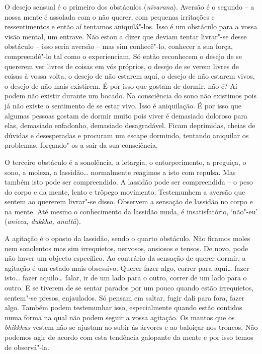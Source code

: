 O desejo sensual é o primeiro dos obstáculos (\emph{nīvarana}). Aversão
é o segundo -- a nossa mente é assolada com o não querer, com pequenas
irritações e ressentimentos e então aí tentamos aniquilá"-los. Isso é um
obstáculo para a vossa visão mental, um entrave. Não estou a dizer que
deviam tentar livrar"-se desse obstáculo -- isso seria aversão -- mas sim
conhecê"-lo, conhecer a sua força, compreendê"-lo tal como o experienciam.
Só então reconhecem o desejo de se quererem ver livres de coisas em vós
próprios, o desejo de se verem livres de coisas à vossa volta, o desejo
de não estarem aqui, o desejo de não estarem vivos, o desejo de não mais
existirem. É por isso que gostam de dormir, não é? Aí podem não existir
durante um bocado. Na consciência do sono não existimos pois já não
existe o sentimento de se estar vivo. Isso é aniquilação. É por isso que
algumas pessoas gostam de dormir muito pois viver é demasiado doloroso
para elas, demasiado enfadonho, demasiado desagradável. Ficam
deprimidas, cheias de dúvidas e desesperadas e procuram um escape
dormindo, tentando aniquilar os problemas, forçando"-os a sair da sua
consciência.

O terceiro obstáculo é a sonolência, a letargia, o entorpecimento, a
preguiça, o sono, a moleza, a lassidão\ldots{} normalmente reagimos a
isto com repulsa. Mas também isto pode ser compreendido. A lassidão pode
ser compreendida -- o peso do corpo e da mente, lento e trôpego
movimento. Testemunhem a aversão que sentem ao quererem livrar"-se disso.
Observem a sensação de lassidão no corpo e na mente. Até mesmo o
conhecimento da lassidão muda, é insatisfatório, `não"-eu' (\emph{anicca,
  dukkha, anattā}).

A agitação é o oposto da lassidão, sendo o quarto obstáculo. Não ficamos
moles nem sonolentos mas sim irrequietos, nervosos, ansiosos e tensos.
De novo, pode não haver um objecto específico. Ao contrário da sensação
de querer dormir, a agitação é um estado mais obsessivo. Querer fazer
algo, correr para aqui\ldots{} fazer isto\ldots{} fazer
aquilo\ldots{} falar, ir de um lado para o outro, correr de um lado para
o outro. E se tiverem de se sentar parados por um pouco quando estão
irrequietos, sentem"-se presos, enjaulados. Só pensam em saltar, fugir
dali para fora, fazer algo. Também podem testemunhar isso, especialmente
quando estão contidos numa forma na qual não podem seguir a vossa
agitação. Os mantos que os \emph{bhikkhus} vestem não se ajustam ao subir
às árvores e ao baloiçar nos troncos. Não podemos agir de acordo com
esta tendência galopante da mente e por isso temos de observá"-la.

